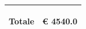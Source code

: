 \documentclass[a4paper]{article}
\begin{document}
                                      \noindent\begin{tabular}{|L{133.1mm} |  L{16mm}| }
                                      \hline
                                        \vspace{2.5mm}
                                        \begin{spacing}{0}
                                          \textbf{Totale}
                                        \end{spacing} &
                                      \vspace{2.5mm}
                                      \begin{spacing}{0}
                                        \euro\hfill
                                   4540.0
                                      \end{spacing}\\
                                      \hline
                                      \end{tabular}
                                      
\end{document}
